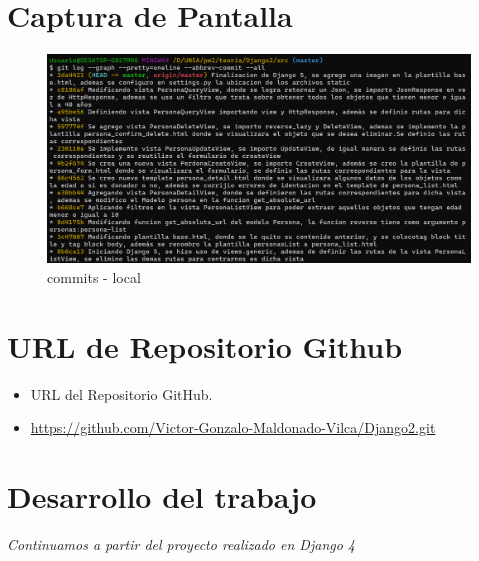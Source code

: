 \documentclass{article}
\begin{document}

	\section{Captura de Pantalla}
  \begin{figure}[H]
    \centering
    \includegraphics[width=1\textwidth, keepaspectratio]{img/commits1.png}
    \caption{commits - local}
  \end{figure}


  \section{URL de Repositorio Github}
  \begin{itemize}
    \item URL del Repositorio GitHub.
    \item \url{https://github.com/Victor-Gonzalo-Maldonado-Vilca/Django2.git}
  \end{itemize}


  \section{Desarrollo del trabajo}
  \textit{Continuamos a partir del proyecto realizado en Django 4}
  
\end{document}
